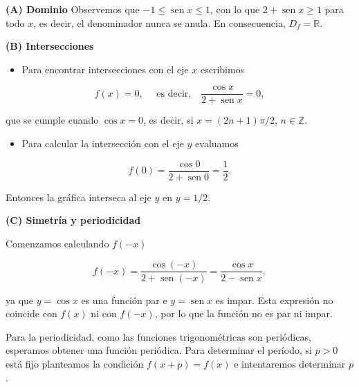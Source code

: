 \documentclass[
  letterpaper,
]{book}
\providecommand{\tightlist}{%
  \setlength{\itemsep}{0pt}\setlength{\parskip}{0pt}}
\theoremstyle{plain}
\theoremstyle{remark}
\begin{document}
\begin{tcolorbox}[enhanced jigsaw, opacityback=0, left=2mm, opacitybacktitle=0.6, toprule=.15mm, bottomrule=.15mm, colbacktitle=quarto-callout-tip-color!10!white, titlerule=0mm, bottomtitle=1mm, title=\textcolor{quarto-callout-tip-color}{\faLightbulb}\hspace{0.5em}{Solución}, toptitle=1mm, colframe=quarto-callout-tip-color-frame, colback=white, breakable, rightrule=.15mm, arc=.35mm, leftrule=.75mm, coltitle=black]

\textbf{(A) Dominio} Observemos que
\(-1\leq \operatorname{sen} x\leq 1\), con lo que
\(2+\operatorname{sen}x\geq 1\) para todo \(x\), es decir, el
denominador nunca se anula. En consecuencia, \(D_f=\mathbb{R}\).

\textbf{(B) Intersecciones}

\begin{itemize}
\tightlist
\item
  Para encontrar intersecciones con el eje \(x\) escribimos
\end{itemize}

\[
f(x)=0, \quad \text{ es decir,} \quad\frac{\cos x}{2+\operatorname{sen} x}=0,
\]

que se cumple cuando \(\cos x=0\), es decir, si \(x=(2n+1)\pi/2\),
\(n\in\mathbb{Z}\).

\begin{itemize}
\tightlist
\item
  Para calcular la intersección con el eje \(y\) evaluamos
\end{itemize}

\[
f(0)=\frac{\cos 0}{2+\operatorname{sen} 0}=\frac{1}{2}.
\]

Entonces la gráfica interseca al eje \(y\) en \(y=1/2\).

\textbf{(C) Simetría y periodicidad}

Comenzamos calculando \(f(-x)\)

\[
f(-x)=\frac{\cos(-x)}{2+\operatorname{sen}(-x)}=\frac{\cos x}{2-\operatorname{sen}x},
\]

ya que \(y=\cos x\) es una función par e \(y=\operatorname{sen} x\) es
impar. Esta expresión no coincide con \(f(x)\) ni con \(f(-x)\), por lo
que la función no es par ni impar.

Para la periodicidad, como las funciones trigonométricas son periódicas,
esperamos obtener una función periódica. Para determinar el período, si
\(p>0\) está fijo planteamos la condición \(f(x+p)=f(x)\) e intentaremos
determinar \(p\).


\end{tcolorbox}
\end{document}
